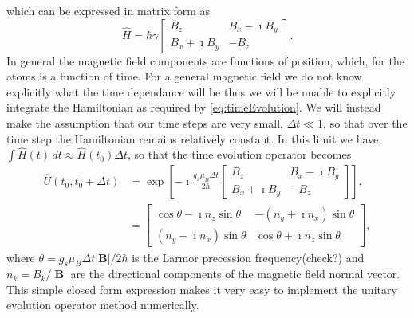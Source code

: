 which can be expressed in matrix form as
\begin{equation*}
    \widehat{H} = \hbar\gamma \begin{bmatrix} B_z & B_x - \imath B_y \\
                                                      B_x + \imath B_y & -B_z \end{bmatrix}.                                         
\end{equation*}
In general the magnetic field components are functions of position, which, for the atoms is a function of time.
For a general magnetic field we do not know explicitly what the time dependance will be thus we will be unable to explicitly integrate the Hamiltonian as required by \autoref{eq:timeEvolution}.
We will instead make the assumption that our time steps are very small, $\Delta t \ll 1$, so that over the time step the Hamiltonian remains relatively constant.
In this limit we have, $\int\widehat{H}(t)\,dt \approx \widehat{H}(t_0)\Delta t$, so that the time evolution operator becomes
\begin{align}
    \widehat{U}(t_0,t_0+\Delta t) &= \exp\left[  -\imath\frac{g_s\mu_B\Delta t}{2 \hbar} \begin{bmatrix} B_z & B_x - \imath B_y \\
                                                      B_x + \imath B_y & -B_z \end{bmatrix} \right],\\
                &= \begin{bmatrix} \cos\theta - \imath n_z \sin\theta & -\left(n_y+\imath n_x\right)\sin\theta \\
                                   \left(n_y-\imath n_x\right)\sin\theta & \cos\theta + \imath n_z \sin\theta\end{bmatrix}, 
\end{align}
where $\theta = g_s \mu_B \Delta t \vert \mathbf{B} \vert / 2\hbar$ is the Larmor precession frequency(check?) and $n_k = B_k / \vert \mathbf{B} \vert$ are the directional components of the magnetic field normal vector.
This simple closed form expression makes it very easy to implement the unitary evolution operator method numerically.

